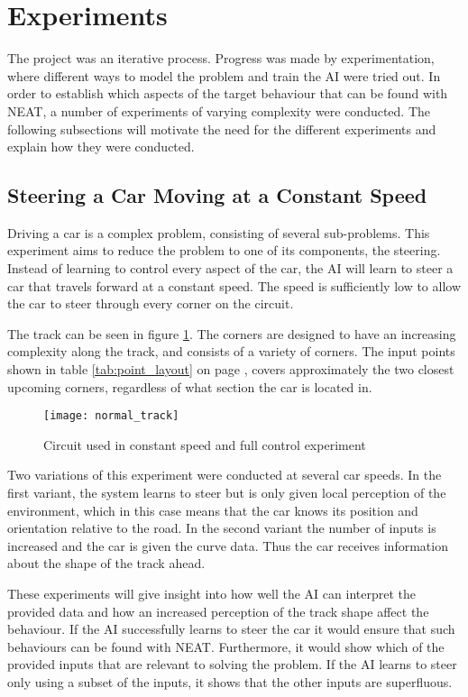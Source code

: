 \section{Experiments}
The project was an iterative process. Progress was made by experimentation, where different ways to model the problem and train the AI were tried out. In order to establish which aspects of the target behaviour that can be found with NEAT, a number of experiments of varying complexity were conducted. The following subsections will motivate the need for the different experiments and explain how they were conducted.

\subsection{Steering a Car Moving at a Constant Speed}
\label{method:constant_speed}
Driving a car is a complex problem, consisting of several sub-problems. This experiment aims to reduce the problem to one of its components, the steering. Instead of learning to control every aspect of the car, the AI will learn to steer a car that travels forward at a constant speed. The speed is sufficiently low to allow the car to steer through every corner on the circuit. 

The track can be seen in figure \ref{fig:normal_track}. The corners are designed to have an increasing complexity along the track, and consists of a variety of corners. The input points shown in table \ref{tab:point_layout} on page \pageref{tab:point_layout}, covers approximately the two closest upcoming corners, regardless of what section the car is located in.

\begin{figure}[H]
\texttt{[image: normal\_track]}
\caption{Circuit used in constant speed and full control experiment}
\label{fig:normal_track}
\centering
\end{figure}

Two variations of this experiment were conducted at several car speeds. In the first variant, the system learns to steer but is only given local perception of the environment, which in this case means that the car knows its position and orientation relative to the road. In the second variant the number of inputs is increased and the car is given the curve data. Thus the car receives information about the shape of the track ahead.

These experiments will give insight into how well the AI can interpret the provided data and how an increased perception of the track shape affect the behaviour. If the AI successfully learns to steer the car it would ensure that such behaviours can be found with NEAT. Furthermore, it would show which of the provided inputs that are relevant to solving the problem. If the AI learns to steer only using a subset of the inputs, it shows that the other inputs are superfluous. 

